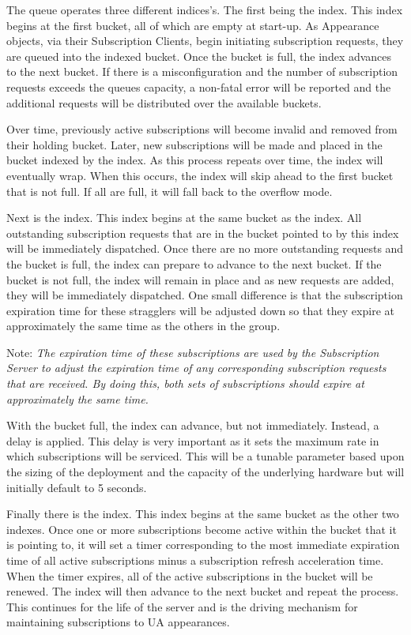 \documentclass[twoside,11pt]{article}
\newcommand{\bold}[1]{\textbf{#1}}
\newcommand{\rt}[1]{{\color[RGB]{237,24,30}{#1}}}
\newcommand{\gt}[1]{{\color[RGB]{47,139,32}{#1}}}
\newcommand{\yt}[1]{{\color[RGB]{255,210,60}{#1}}}
\begin{document}
The queue operates three different indices's.  The first being the \yt{\bold{deferring}} index. 
This index begins at the first bucket, all of which are empty at start-up.  As Appearance objects,
via their Subscription Clients, begin initiating subscription requests, they are queued into the
indexed bucket.  Once the bucket is full, the index advances to the next bucket.  If there is a
misconfiguration and the number of subscription requests exceeds the queues capacity, a non-fatal
error will be reported and the additional requests will be distributed over the available buckets.

Over time, previously active subscriptions will become invalid and removed from their holding
bucket.  Later, new subscriptions will be made and placed in the bucket indexed by the
\yt{\bold{deferring}} index.  As this process repeats over time, the index will eventually wrap. 
When this occurs, the index will skip ahead to the first bucket that is not full.  If all are full,
it will fall back to the overflow mode.

Next is the \gt{\bold{subscribing}} index.  This index begins at the same bucket as the
\yt{\bold{deferring}} index.  All outstanding subscription requests that are in the bucket pointed
to by this index will be immediately dispatched.  Once there are no more outstanding requests and
the bucket is full, the index can prepare to advance to the next bucket.  If the bucket is not full,
the index will remain in place and as new requests are added, they will be immediately dispatched. 
One small difference is that the subscription expiration time for these stragglers will be adjusted
down so that they expire at approximately the same time as the others in the group.

Note: \emph{The expiration time of these subscriptions are used by the Subscription Server to adjust
the expiration time of any corresponding subscription requests that are received.  By doing this,
both sets of subscriptions should expire at approximately the same time.}

With the bucket full, the index can advance, but not immediately.  Instead, a delay is applied. 
This delay is very important as it sets the maximum rate in which subscriptions will be serviced. 
This will be a tunable parameter based upon the sizing of the deployment and the capacity of the
underlying hardware but will initially default to 5 seconds.

Finally there is the \rt{\bold{refreshing}} index.  This index begins at the same bucket as the
other two indexes.  Once one or more subscriptions become active within the bucket that it is
pointing to, it will set a timer corresponding to the most immediate expiration time of all active
subscriptions minus a subscription refresh acceleration time.  When the timer expires, all of the
active subscriptions in the bucket will be renewed.  The index will then advance to the next bucket
and repeat the process.  This continues for the life of the server and is the driving mechanism for
maintaining subscriptions to UA appearances.
\end{document}
